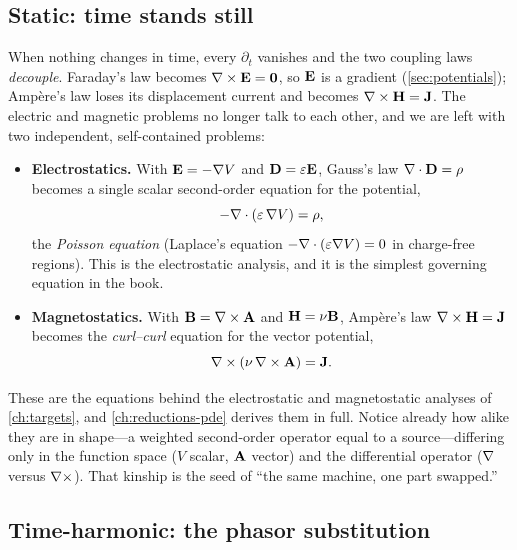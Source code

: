 \subsection{Static: time stands still}

When nothing changes in time, every $\partial_t$ vanishes and the two coupling
laws \emph{decouple}. Faraday's law becomes $\nabla\times\mathbf{E}=\bm0$, so $\mathbf{E}$ is a
gradient (\cref{sec:potentials}); Amp\`ere's law loses its displacement current
and becomes $\nabla\times\mathbf{H}=\mathbf{J}$. The electric and magnetic problems no longer talk
to each other, and we are left with two independent, self-contained problems:

\begin{itemize}
  \item \textbf{Electrostatics.} With $\mathbf{E}=-\nabla V$ and $\mathbf{D}=\varepsilon\mathbf{E}$,
  Gauss's law $\nabla\cdot\mathbf{D}=\rho$ becomes a single scalar second-order equation for
  the potential,
  \begin{equation}
    -\nabla\cdot(\varepsilon\,\nabla V) = \rho, \label{eq:poisson}
  \end{equation}
  the \emph{Poisson equation} (Laplace's equation $-\nabla\cdot(\varepsilon\nabla
  V)=0$ in charge-free regions). This is the electrostatic analysis, and it is
  the simplest governing equation in the book.

  \item \textbf{Magnetostatics.} With $\mathbf{B}=\nabla\times\mathbf{A}$ and $\mathbf{H}=\nu\mathbf{B}$,
  Amp\`ere's law $\nabla\times\mathbf{H}=\mathbf{J}$ becomes the \emph{curl--curl} equation for the
  vector potential,
  \begin{equation}
    \nabla\times(\nu\,\nabla\times\mathbf{A}) = \mathbf{J}. \label{eq:curlcurl-static}
  \end{equation}
\end{itemize}

These are the equations behind the electrostatic and magnetostatic analyses of
\cref{ch:targets}, and \cref{ch:reductions-pde} derives them in full. Notice
already how alike they are in shape---a weighted second-order operator equal to
a source---differing only in the function space ($V$ scalar, $\mathbf{A}$ vector) and
the differential operator ($\nabla$ versus $\nabla\times$). That kinship is the seed of
``the same machine, one part swapped.''

\subsection{Time-harmonic: the phasor substitution}

